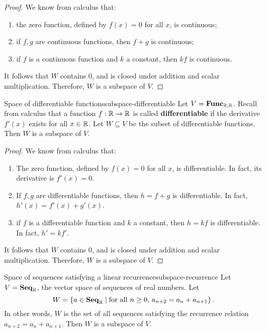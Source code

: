 \begin{proof}
  We know from calculus that:
  \begin{enumerate}
  \item the zero function, defined by $f(x)=0$ for all $x$, is
    continuous;
  \item if $f,g$ are continuous functions, then $f+g$ is
    continuous;
  \item if $f$ is a continuous function and $k$ a constant, then $kf$
    is continuous.
  \end{enumerate}
  It follows that $W$ contains $0$, and is closed under addition and
  scalar multiplication. Therefore, $W$ is a subspace of\/ $V$.
\end{proof}

\begin{example}{Space of differentiable functions}{subspace-differentiable}
  Let $V = \mathbf{Func}_{\mathbb{R},\mathbb{R}}$. Recall from calculus that a function
  $f:\mathbb{R}\to\mathbb{R}$ is called \textbf{differentiable}%
   if the derivative $f'(x)$ exists for
  all $x\in\mathbb{R}$. Let $W\subseteq V$ be the subset of differentiable
  functions. Then $W$ is a subspace of\/ $V$.
\end{example}

\begin{proof}
  We know from calculus that:
  \begin{enumerate}
  \item The zero function, defined by $f(x)=0$ for all $x$, is
    differentiable. In fact, its derivative is $f'(x) = 0$.
  \item If $f,g$ are differentiable functions, then $h=f+g$ is
    differentiable. In fact, $h'(x) = f'(x) + g'(x)$.
  \item if $f$ is a differentiable function and $k$ a constant, then
    $h=kf$ is differentiable. In fact, $h' = kf'$.
  \end{enumerate}
  It follows that $W$ contains $0$, and is closed under addition and
  scalar multiplication. Therefore, $W$ is a subspace of\/ $V$.
\end{proof}

\begin{example}{Space of sequences satisfying a linear recurrence}{subspace-recurrence}
  Let $V=\mathbf{Seq}_{\mathbb{R}}$, the vector space of sequences of real
  numbers. Let
  \begin{equation*}
    W = \left\{a \in \mathbf{Seq}_{\mathbb{R}} \mid \mbox{for all $n\geq 0$, $a_{n+2}=a_n+a_{n+1}$}\right\}.
  \end{equation*}
  In other words, $W$ is the set of all sequences satisfying the
  recurrence relation $a_{n+2}=a_n+a_{n+1}$. Then $W$ is a subspace of\/ $V$.
\end{example}

